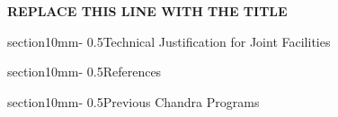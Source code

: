 \documentclass[letterpaper,11pt]{article}
\makeatletter
\renewcommand{\section}{\@startsection%
{section}{1}{0mm}{-\baselineskip}%
{0.5\baselineskip}{\normalfont\Large\bfseries}}%
\makeatother
\begin{document}
\pagestyle{plain}


 

\begin{center} 
\bfseries\uppercase{%
replace this line with the title
}
\end{center}












\section{Technical Justification for Joint Facilities}




\section{References}




\onecolumn

\section{Previous Chandra Programs}


 
\end{document}
